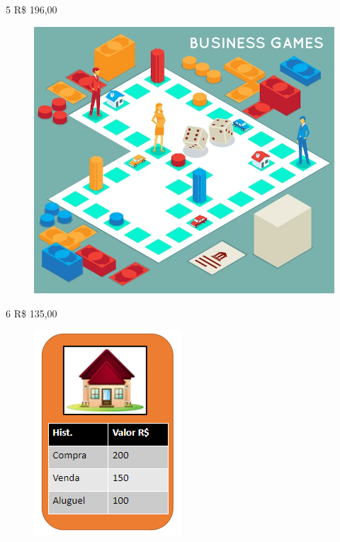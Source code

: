 


\pagebreak
\num{5} R\$ 196,00

\begin{figure}[htpb!]
\includegraphics[width=.9\textwidth]{./media/image68.png}
\end{figure}



\pagebreak
\num{6} R\$ 135,00

\begin{figure}[htpb!]
\includegraphics[width=.9\textwidth]{./media/image69.png}
\end{figure}

